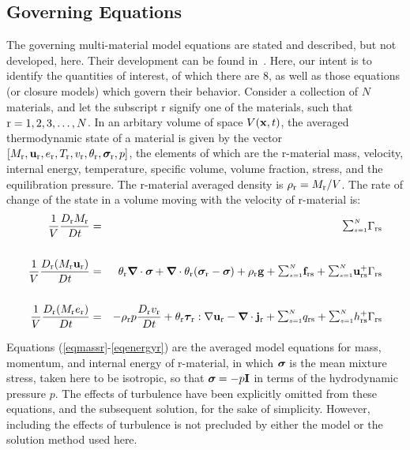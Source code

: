 \subsection{Governing Equations}\label{sec:governing_equations}
The governing multi-material model equations are stated and described, but
not developed, here.  Their development can be found in~\cite{kashiwa2000}.
Here, our intent is to identify the quantities of interest, of which there
are 8, as well as those equations (or closure models) which govern their
behavior.  Consider a collection of $N$ materials, and let the subscript r
signify one of the materials, such that ${\rm r} = 1, 2, 3, \dots, N$.  In an
arbitary volume of space $V({\bf x},t)$, the averaged thermodynamic state of a
material is given by the vector $[M_{\rm r}, {\bf u}_{\rm r}, e_{\rm r}, T_{\rm r}, v_{\rm r},
\theta_{\rm r}, \mbox{\boldmath $\sigma \!\!$ \unboldmath}_{\rm r}, p]$, the elements of which are the r-material mass,
velocity, internal energy, temperature, specific volume, volume fraction,
stress, and the equilibration pressure.  The r-material averaged density is
$\rho_{\rm r} = M_{\rm r}/V$.  The rate of change of the state in a volume moving
with the velocity of r-material is:
%
\noindent
\begin{eqnarray}
{1\over V}{D_\rmr M_\rmr \over Dt} &=&
\SUM\Gamma_{\rmr\rms}
\label{eqmassr} \\
\nonumber \\
{1\over V}{D_\rmr (M_\rmr \bfu_\rmr) \over Dt} &=&
\theta_\rmr \bnabla\cdot\sig +
\bnabla\cdot\theta_\rmr(\sig_\rmr - \sig) + 
\rho_\rmr\bfg + 
\SUM \bff_{\rmr\rms} + 
\SUM \bfu_{\rmr\rms}^+ 
\Gamma_{\rmr\rms}
\label{eqmomr}\\ \nonumber \\
{1\over V}{D_\rmr (M_\rmr e_\rmr) \over Dt} &=& -
\rho_\rmr p {D_\rmr v_\rmr\over Dt} +
\theta_\rmr\taubold_\rmr:\nabla\bfu_\rmr - 
\bnabla\cdot\bfj_\rmr +
\SUM q_{\rmr\rms} +
\SUM h_{\rmr\rms}^+ 
\Gamma_{\rmr\rms}
\label{eqenergyr}
\end{eqnarray}

Equations (\ref{eqmassr}-\ref{eqenergyr}) are the averaged model equations
for mass, momentum, and internal energy of r-material, in which $\mbox{\boldmath $\sigma \!\!$ \unboldmath}$ is
the mean mixture stress, taken here to be isotropic, so that $\mbox{\boldmath $\sigma \!\!$ \unboldmath} = -p{\bf I}$
in terms of the hydrodynamic pressure $p$.  The effects of turbulence have
been explicitly omitted from these equations, and the subsequent solution,
for the sake of simplicity.  However, including the effects of turbulence
is not precluded by either the model or the solution method used here.

